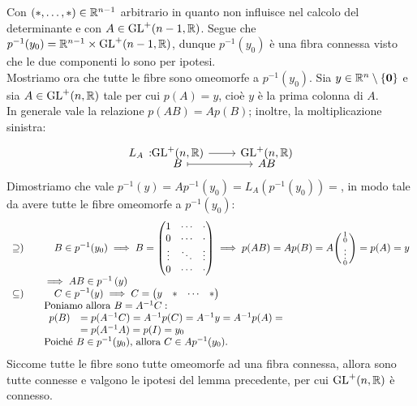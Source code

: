 \begin{demonstration}
	Con $(*,\dots, *)\in\mathbb{R}^{n-1}$ arbitrario in quanto non influisce nel calcolo del determinante e con $A\in\operatorname{GL}^+(n-1,\mathbb{R})$. Segue che $p^{-1}(y_0)=\mathbb{R}^{n-1}\times\operatorname{GL}^+(n-1,\mathbb{R})$, dunque $p^{-1}(y_0)$ è una fibra connessa visto che le due componenti lo sono per ipotesi.\\
	Mostriamo ora che tutte le fibre sono omeomorfe a $p^{-1}(y_0)$. Sia $y\in\mathbb{R}^n\setminus\{\mathbf{0}\}$ e sia $A\in\operatorname{GL}^+(n,\mathbb{R})$ tale per cui $p(A)=y$, cioè $y$ è la prima colonna di $A$.\\
	In generale vale la relazione $p(AB)=Ap(B)$; inoltre, la moltiplicazione sinistra:
	\begin{equation*}
		\funztot {L_A} {\gl^+(n,\realset)} {\gl^+(n,\realset)} B {AB}
	\end{equation*}
	 Dimostriamo che vale $p^{-1}(y)=Ap^{-1}(y_0)=L_A\left( p^{-1}(y_0)\right)=$, in modo tale da avere tutte le fibre omeomorfe a $p^{-1}(y_0)$:
	\begin{equation*}
		\begin{array}{ll}
			\supseteq)\quad & \displaystyle \quad B\in p^{-1}(y_0) \implies B=\begin{pmatrix}
				1	   & \cdots  & \cdot  \\
				0 	   & \cdots  & \cdot   \\
				\vdots & \ddots  & \vdots   \\
				0      & \cdots  & \cdot
			\end{pmatrix} \implies	p(AB)=Ap(B)=A\begin{psmallmatrix}
				1 \\ 0 \\ \vdots \\ 0
			\end{psmallmatrix}= p(A)=y\\
			& \implies AB\in p^{-1}\left(y\right)\\
			\subseteq)\quad & \displaystyle \quad C\in p^{-1}(y) \implies C=\begin{pmatrix}
				y & * & \cdots & *
			\end{pmatrix}\\
		&\text{Poniamo allora }  B=A^{-1}C:\\
		&\begin{array}{ll}
		p(B)&=p(A^{-1}C)=A^{-1}p(C)=A^{-1}y=A^{-1}p(A)=\\
		&=p(A^{-1}A)=p(I)=y_0
		\end{array}\\
		&\text{Poiché } B\in p^{-1}(y_0)\text{, allora }C\in Ap^{-1}(y_0).
		\end{array}
		\end{equation*}
	Siccome tutte le fibre sono tutte omeomorfe ad una fibra connessa, allora sono tutte connesse e valgono le ipotesi del lemma precedente, per cui $\operatorname{GL}^+(n,\mathbb{R})$ è connesso.
\end{demonstration}
